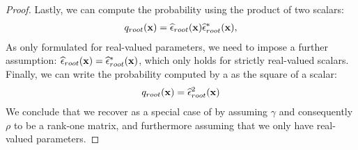 \begin{proof}
	Lastly, we can compute the probability using the product of two scalars:
	\begin{align}
		q_{root}(\mathbf{x}) = \widehat{\epsilon}_{root}(\mathbf{x}) \widehat{\epsilon}_{root}^*(\mathbf{x}),
	\end{align}
	As \citet{loconte2024subtractive} only formulated \snpcs for real-valued parameters, we need to impose a further assumption:
	$\widehat{\epsilon}_{root}(\mathbf{x})= \widehat{\epsilon}_{root}^*(\mathbf{x})$, which only holds for strictly real-valued scalars. Finally, we can write the probability computed by a \pvc as the square of a scalar:
	\begin{align}
		q_{root}(\mathbf{x}) = \widehat{\epsilon}_{root}^2(\mathbf{x})
	\end{align}
	We conclude that we recover \snpcs as a special case of \pvc by assuming $\gamma$ and consequently $\rho$ to be a rank-one matrix, and furthermore assuming that we only have real-valued parameters.
\end{proof}







